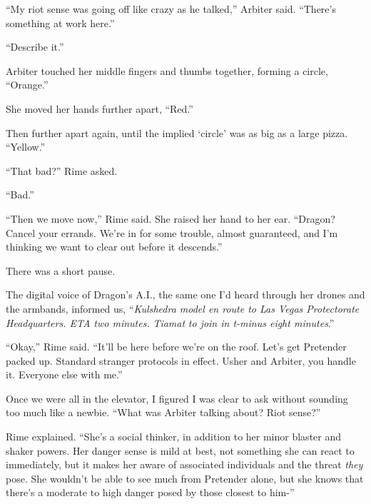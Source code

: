 ``My riot sense was going off like crazy as he talked,'' Arbiter said.  ``There's something at work here.''



``Describe it.''



Arbiter touched her middle fingers and thumbs together, forming a circle, ``Orange.''



She moved her hands further apart, ``Red.''



Then further apart again, until the implied `circle' was as big as a large pizza.  ``Yellow.''



``That bad?''  Rime asked.



``Bad.''



``Then we move now,'' Rime said.  She raised her hand to her ear.  ``Dragon?  Cancel your errands.  We're in for some trouble, almost guaranteed, and I'm thinking we want to clear out before it descends.''



There was a short pause.



The digital voice of Dragon's A.I., the same one I'd heard through her drones and the armbands, informed us, ``\emph{Kulshedra model en route to Las Vegas Protectorate Headquarters.  ETA two minutes.  }\emph{Tiamat }\emph{to join in t-minus eight minutes}.''



``Okay,'' Rime said.  ``It'll be here before we're on the roof.  Let's get Pretender packed up.  Standard stranger protocols in effect.  Usher and Arbiter, you handle it.  Everyone else with me.''



Once we were all in the elevator, I figured I was clear to ask without sounding too much like a newbie.  ``What was Arbiter talking about?  Riot sense?''



Rime explained.  ``She's a social thinker, in addition to her minor blaster and shaker powers.  Her danger sense is mild at best, not something she can react to immediately, but it makes her aware of associated individuals and the threat \emph{they} pose.  She wouldn't be able to see much from Pretender alone, but she knows that there's a moderate to high danger posed by those closest to him-''



